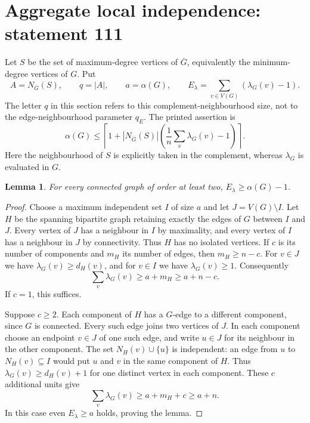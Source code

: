 \documentclass[11pt,a4paper]{article}
\newtheorem{lemma}[theorem]{Lemma}
\theoremstyle{remark}
\begin{document}
\section{Aggregate local independence: statement 111}\label{sec:111}

Let $S$ be the set of maximum-degree vertices of $\overline G$, equivalently
the minimum-degree vertices of $G$. Put
\[
A=N_{\overline G}(S),\qquad q=|A|,\qquad
a=\alpha(G),\qquad E_\lambda=\sum_{v\in V(G)}(\lambda_G(v)-1).
\]
The letter $q$ in this section refers to this complement-neighbourhood
size, not to the edge-neighbourhood parameter $q_E$.
The printed assertion is
\begin{equation}\label{eq:111}
\boxed{\alpha(G)\le
\left\lceil1+|N_{\overline G}(S)|
\left(\frac1n\sum_v\lambda_G(v)-1\right)\right\rceil.}
\end{equation}
Here the neighbourhood of $S$ is explicitly taken in the complement,
whereas $\lambda_G$ is evaluated in $G$.

\begin{lemma}\label{lem:sumlambda}
For every connected graph of order at least two,
$E_\lambda\ge\alpha(G)-1$.
\end{lemma}
\begin{proof}
Choose a maximum independent set $I$ of size $a$ and let $J=V(G)\setminus I$.
Let $H$ be the spanning bipartite graph retaining exactly the edges of $G$
between $I$ and $J$. Every vertex of $J$ has a neighbour in $I$ by
maximality, and every vertex of $I$ has a neighbour in $J$ by connectivity.
Thus $H$ has no isolated vertices. If $c$ is its number of components and
$m_H$ its number of edges, then $m_H\ge n-c$.
For $v\in J$ we have $\lambda_G(v)\ge d_H(v)$, and for $v\in I$ we
have $\lambda_G(v)\ge1$. Consequently
\[
\sum_v\lambda_G(v)\ge a+m_H\ge a+n-c.
\]
If $c=1$, this suffices.

Suppose $c\ge2$. Each component of $H$ has a $G$-edge to a different
component, since $G$ is connected. Every such edge joins two vertices
of $J$. In each component choose an endpoint $v\in J$ of one such edge,
and write $u\in J$ for its neighbour in the other component.
The set $N_H(v)\cup\{u\}$ is independent: an edge from $u$ to
$N_H(v)\subseteq I$ would put $u$ and $v$ in the same component of $H$.
Thus $\lambda_G(v)\ge d_H(v)+1$ for one distinct vertex in each
component. These $c$ additional units give
\[
\sum_v\lambda_G(v)\ge a+m_H+c\ge a+n.
\]
In this case even $E_\lambda\ge a$ holds, proving the lemma.
\end{proof}
\end{document}
